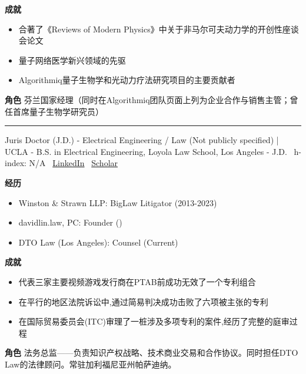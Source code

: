 \par{\footnotesize\color{mainred}\textbf{成就}}
\begin{itemize}[leftmargin=1.2em,itemsep=0pt,topsep=0pt]
\item {\footnotesize 合著了《Reviews of Modern Physics》中关于非马尔可夫动力学的开创性座谈会论文}
\item {\footnotesize 量子网络医学新兴领域的先驱}
\item {\footnotesize Algorithmiq量子生物学和光动力疗法研究项目的主要贡献者}
\end{itemize}
\par{\footnotesize\color{mainred}\textbf{角色}} {\footnotesize 芬兰国家经理（同时在Algorithmiq团队页面上列为企业合作与销售主管；曾任首席量子生物学研究员）}
\vspace{2pt}\hrule\vspace{2pt}
\vspace{4pt}
\par{\footnotesize\color{graytext}Juris Doctor (J.D.) - Electrical Engineering / Law (Not publicly specified) | UCLA - B.S. in Electrical Engineering, Loyola Law School, Los Angeles - J.D. \textbar\  h-index: N/A \textbar\  \href{https://www.linkedin.com/in/dklin/}{LinkedIn} \textbar\  \href{N/A}{Scholar}}
\par{\footnotesize\color{mainred}\textbf{经历}}
\begin{itemize}[leftmargin=1.2em,itemsep=0pt,topsep=0pt]
\item {\footnotesize Winston \& Strawn LLP: BigLaw Litigator (2013-2023)}
\item {\footnotesize davidlin.law, PC: Founder ()}
\item {\footnotesize DTO Law (Los Angeles): Counsel (Current)}
\end{itemize}
\par{\footnotesize\color{mainred}\textbf{成就}}
\begin{itemize}[leftmargin=1.2em,itemsep=0pt,topsep=0pt]
\item {\footnotesize 代表三家主要视频游戏发行商在PTAB前成功无效了一个专利组合}
\item {\footnotesize 在平行的地区法院诉讼中,通过简易判决成功击败了六项被主张的专利}
\item {\footnotesize 在国际贸易委员会(ITC)审理了一桩涉及多项专利的案件,经历了完整的庭审过程}
\end{itemize}
\par{\footnotesize\color{mainred}\textbf{角色}} {\footnotesize 法务总监——负责知识产权战略、技术商业交易和合作协议。同时担任DTO Law的法律顾问。常驻加利福尼亚州帕萨迪纳。}
